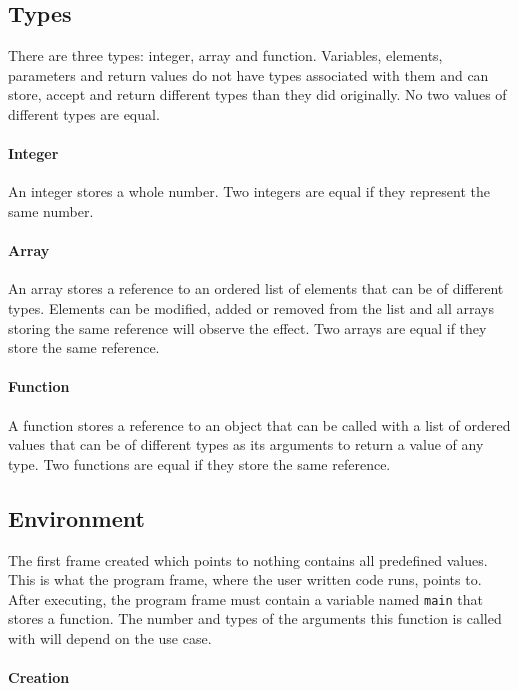 \subsection{Types}

There are three types: integer, array and function. Variables, elements, parameters and return values do not have types associated with them and can store, accept and return different types than they did originally. No two values of different types are equal.

\paragraph{Integer}

An integer stores a whole number. Two integers are equal if they represent the same number.

\paragraph{Array}

An array stores a reference to an ordered list of elements that can be of different types. Elements can be modified, added or removed from the list and all arrays storing the same reference will observe the effect. Two arrays are equal if they store the same reference.

\paragraph{Function}

A function stores a reference to an object that can be called with a list of ordered values that can be of different types as its arguments to return a value of any type. Two functions are equal if they store the same reference.

\subsection{Environment}

The first frame created which points to nothing contains all predefined values. This is what the program frame, where the user written code runs, points to. After executing, the program frame must contain a variable named \verb|main| that stores a function. The number and types of the arguments this function is called with will depend on the use case.

\paragraph{Creation}

